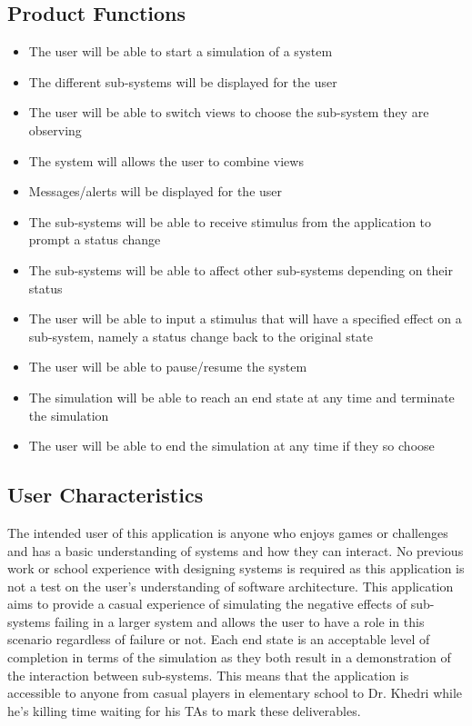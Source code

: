 \documentclass[12pt, titlepage]{article}
\begin{document}
\subsection{Product Functions}
\begin{itemize}
\item The user will be able to start a simulation of a system
\item The different sub-systems will be displayed for the user
\item The user will be able to switch views to choose the sub-system they are observing
\item The system will allows the user to combine views
\item Messages/alerts will be displayed for the user
\item The sub-systems will be able to receive stimulus from the application to prompt a status change
\item The sub-systems will be able to affect other sub-systems depending on their status
\item The user will be able to input a stimulus that will have a specified effect on a sub-system, namely a status change back to the original state
\item The user will be able to pause/resume the system
\item The simulation will be able to reach an end state at any time and terminate the simulation
\item The user will be able to end the simulation at any time if they so choose
\end{itemize}

\subsection{User Characteristics}
The intended user of this application is anyone who enjoys games or challenges and has a basic understanding of systems and how they can interact. No previous work or school experience with designing systems is required as this application is not a test on the user's understanding of software architecture. This application aims to provide a casual experience of simulating the negative effects of sub-systems failing in a larger system and allows the user to have a role in this scenario regardless of failure or not. Each end state is an acceptable level of completion in terms of the simulation as they both result in a demonstration of the interaction between sub-systems. This means that the application is accessible to anyone from casual players in elementary school to Dr. Khedri while he's killing time waiting for his TAs to mark these deliverables.
\end{document}
